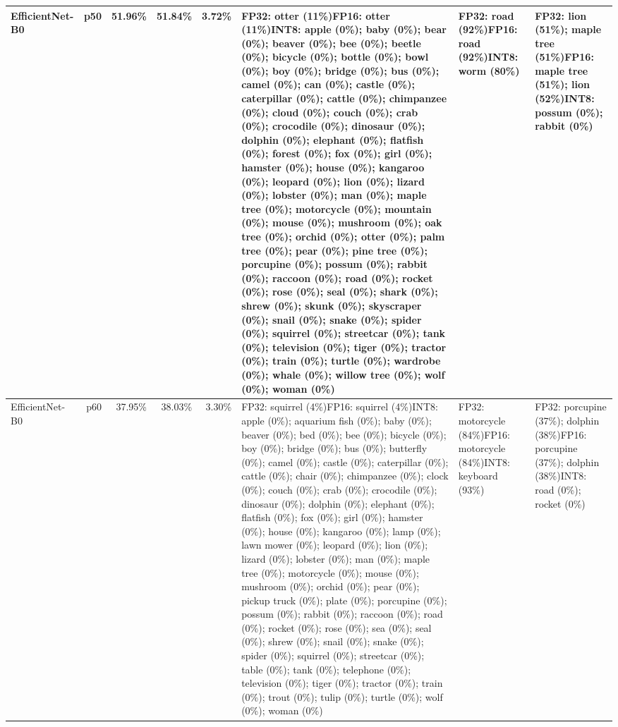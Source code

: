 \begin{longtable}{p{2.8cm} r r r r p{5.0cm} p{4.2cm} p{4.2cm}}
EfficientNet-B0 & p50 & 51.96\% & 51.84\% & 3.72\% & FP32: otter (11\%)\newline FP16: otter (11\%)\newline INT8: apple (0\%); baby (0\%); bear (0\%); beaver (0\%); bee (0\%); beetle (0\%); bicycle (0\%); bottle (0\%); bowl (0\%); boy (0\%); bridge (0\%); bus (0\%); camel (0\%); can (0\%); castle (0\%); caterpillar (0\%); cattle (0\%); chimpanzee (0\%); cloud (0\%); couch (0\%); crab (0\%); crocodile (0\%); dinosaur (0\%); dolphin (0\%); elephant (0\%); flatfish (0\%); forest (0\%); fox (0\%); girl (0\%); hamster (0\%); house (0\%); kangaroo (0\%); leopard (0\%); lion (0\%); lizard (0\%); lobster (0\%); man (0\%); maple tree (0\%); motorcycle (0\%); mountain (0\%); mouse (0\%); mushroom (0\%); oak tree (0\%); orchid (0\%); otter (0\%); palm tree (0\%); pear (0\%); pine tree (0\%); porcupine (0\%); possum (0\%); rabbit (0\%); raccoon (0\%); road (0\%); rocket (0\%); rose (0\%); seal (0\%); shark (0\%); shrew (0\%); skunk (0\%); skyscraper (0\%); snail (0\%); snake (0\%); spider (0\%); squirrel (0\%); streetcar (0\%); tank (0\%); television (0\%); tiger (0\%); tractor (0\%); train (0\%); turtle (0\%); wardrobe (0\%); whale (0\%); willow tree (0\%); wolf (0\%); woman (0\%) & FP32: road (92\%)\newline FP16: road (92\%)\newline INT8: worm (80\%) & FP32: lion (51\%); maple tree (51\%)\newline FP16: maple tree (51\%); lion (52\%)\newline INT8: possum (0\%); rabbit (0\%) \\ \hline
EfficientNet-B0 & p60 & 37.95\% & 38.03\% & 3.30\% & FP32: squirrel (4\%)\newline FP16: squirrel (4\%)\newline INT8: apple (0\%); aquarium fish (0\%); baby (0\%); beaver (0\%); bed (0\%); bee (0\%); bicycle (0\%); boy (0\%); bridge (0\%); bus (0\%); butterfly (0\%); camel (0\%); castle (0\%); caterpillar (0\%); cattle (0\%); chair (0\%); chimpanzee (0\%); clock (0\%); couch (0\%); crab (0\%); crocodile (0\%); dinosaur (0\%); dolphin (0\%); elephant (0\%); flatfish (0\%); fox (0\%); girl (0\%); hamster (0\%); house (0\%); kangaroo (0\%); lamp (0\%); lawn mower (0\%); leopard (0\%); lion (0\%); lizard (0\%); lobster (0\%); man (0\%); maple tree (0\%); motorcycle (0\%); mouse (0\%); mushroom (0\%); orchid (0\%); pear (0\%); pickup truck (0\%); plate (0\%); porcupine (0\%); possum (0\%); rabbit (0\%); raccoon (0\%); road (0\%); rocket (0\%); rose (0\%); sea (0\%); seal (0\%); shrew (0\%); snail (0\%); snake (0\%); spider (0\%); squirrel (0\%); streetcar (0\%); table (0\%); tank (0\%); telephone (0\%); television (0\%); tiger (0\%); tractor (0\%); train (0\%); trout (0\%); tulip (0\%); turtle (0\%); wolf (0\%); woman (0\%) & FP32: motorcycle (84\%)\newline FP16: motorcycle (84\%)\newline INT8: keyboard (93\%) & FP32: porcupine (37\%); dolphin (38\%)\newline FP16: porcupine (37\%); dolphin (38\%)\newline INT8: road (0\%); rocket (0\%) \\ \hline

\end{longtable}
